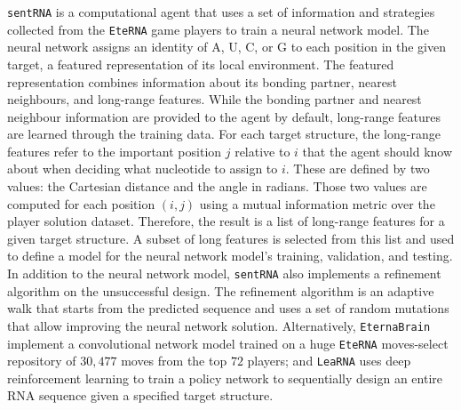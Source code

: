 \texttt{sentRNA} \cite{shi2018sentrna} is a computational agent that uses a set of information and strategies collected from the \texttt{EteRNA} game players to train a neural network model. The neural network assigns an identity of A, U, C, or G to each position in the given target, a featured representation of its local environment. The featured representation combines information about its bonding partner, nearest neighbours, and long-range features. While the bonding partner and nearest neighbour information are provided to the agent by default, long-range features are learned through the training data. For each target structure, the long-range features refer to the important position $j$ relative to $i$ that the agent should know about when deciding what nucleotide to assign to $i$. These are defined by two values: the Cartesian distance and the angle in radians. Those two values are computed for each position $(i,j)$ using a mutual information metric over the player solution dataset. Therefore, the result is a list of long-range features for a given target structure. A subset of long features is selected from this list and used to define a model for the neural network model's training, validation, and testing. In addition to the neural network model, \texttt{sentRNA} also implements a refinement algorithm on the unsuccessful design. The refinement algorithm is an adaptive walk that starts from the predicted sequence and uses a set of random mutations that allow improving the neural network solution. Alternatively, \texttt{EternaBrain} \cite{koodli2019eternabrain} implement a convolutional network model trained on a huge \texttt{EteRNA} moves-select repository of $30,477$ moves from the top $72$ players; and \texttt{LeaRNA} \cite{runge2018learning} uses deep reinforcement learning to train a policy network to sequentially design an entire \ac{RNA} sequence given a specified target structure.

